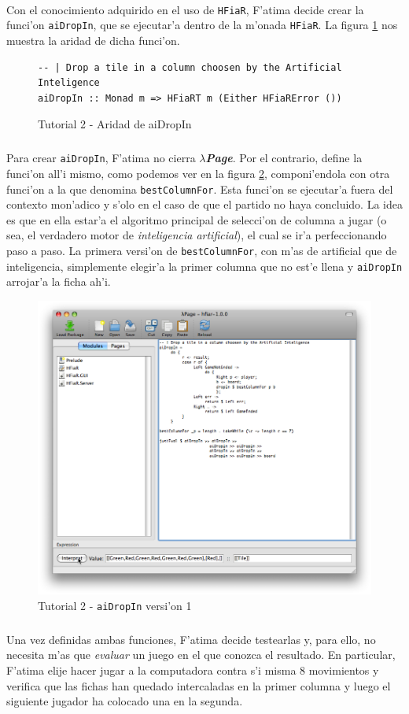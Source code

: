 \documentclass[a4paper]{article}
\newcommand{\hpage}{\textbf{\textsl{$\lambda$Page}}}
\begin{document}
\paragraph{}Con el conocimiento adquirido en el uso de \texttt{HFiaR}, F'atima decide crear la funci'on \texttt{aiDropIn}, que se ejecutar'a dentro de la m'onada \texttt{HFiaR}.  La figura \ref{tut207} nos muestra la aridad de dicha funci'on.
\begin{figure}[hp]
	\begin{center}
		\begin{lstlisting}
-- | Drop a tile in a column choosen by the Artificial Inteligence
aiDropIn :: Monad m => HFiaRT m (Either HFiaRError ())
		\end{lstlisting}
		\caption{Tutorial 2 - Aridad de aiDropIn}
		\label{tut207}
	\end{center}
\end{figure}
\subparagraph{}Para crear \texttt{aiDropIn}, F'atima no cierra \hpage.  Por el contrario, define la funci'on all'i mismo, como podemos ver en la figura \ref{tut208}, componi'endola con otra funci'on a la que denomina \texttt{bestColumnFor}.  Esta funci'on se ejecutar'a fuera del contexto mon'adico y s'olo en el caso de que el partido no haya concluido.  La idea es que en ella estar'a el algoritmo principal de selecci'on de columna a jugar (o sea, el verdadero motor de \textsl{inteligencia artificial}), el cual se ir'a perfeccionando paso a paso.  La primera versi'on de \texttt{bestColumnFor}, con m'as de artificial que de inteligencia, simplemente elegir'a la primer columna que no est'e llena y \texttt{aiDropIn} arrojar'a la ficha ah'i.
\begin{figure}[hp]
	\begin{center}
        	\includegraphics[width=.75\textwidth]{pictures/tut2/06}
		\caption{Tutorial 2 - \texttt{aiDropIn} versi'on 1}
		\label{tut208}
	\end{center}
\end{figure}
\subparagraph{}Una vez definidas ambas funciones, F'atima decide testearlas y, para ello, no necesita m'as que \textsl{evaluar} un juego en el que conozca el resultado.  En particular, F'atima elije hacer jugar a la computadora contra s'i misma 8 movimientos y verifica que las fichas han quedado intercaladas en la primer columna y luego el siguiente jugador ha colocado una en la segunda.
\end{document}
